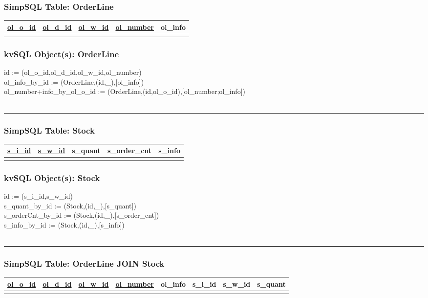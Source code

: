 \subsubsection*{SimpSQL Table: OrderLine}  
\begin{tabular}{ |c|c|c|c|c| }
 \hline
 \underline{ol\_o\_id} & \underline{ol\_d\_id} & \underline{ol\_w\_id} &
 \underline{ol\_number} & ol\_info\\
 \hline
 &   &   & & \\
 \hline
\end{tabular}

\subsubsection*{kvSQL Object(s): OrderLine}  
id := (ol\_o\_id,ol\_d\_id,ol\_w\_id,ol\_number) \\
ol\_info\_by\_id :=
(OrderLine,(id,\_),[ol\_info]) \\
ol\_number+info\_by\_ol\_o\_id :=
(OrderLine,(id,ol\_o\_id),[ol\_number;ol\_info]) \\
\\ 
\hrule


\subsubsection*{SimpSQL Table: Stock}  
\begin{tabular}{ |c|c|c|c|c| }
 \hline
 \underline{s\_i\_id} & \underline{s\_w\_id} & s\_quant & s\_order\_cnt &
 s\_info \\
 \hline
 &   &   & & \\
 \hline
\end{tabular}

\subsubsection*{kvSQL Object(s): Stock}  
id := (s\_i\_id,s\_w\_id) \\
s\_quant\_by\_id :=
(Stock,(id,\_),[s\_quant]) \\
s\_orderCnt\_by\_id :=
(Stock,(id,\_),[s\_order\_cnt]) \\
s\_info\_by\_id :=
(Stock,(id,\_),[s\_info]) \\
\\ 
\hrule


\subsubsection*{SimpSQL Table: OrderLine JOIN Stock}
\begin{tabular}{ |c|c|c|c|c|c|c|c| }
 \hline
 \underline{ol\_o\_id} & \underline{ol\_d\_id} & \underline{ol\_w\_id} &
 \underline{ol\_number} & ol\_info &s\_i\_id & s\_w\_id & s\_quant \\
 \hline
 &   &   & & & & &\\
 \hline
\end{tabular}

